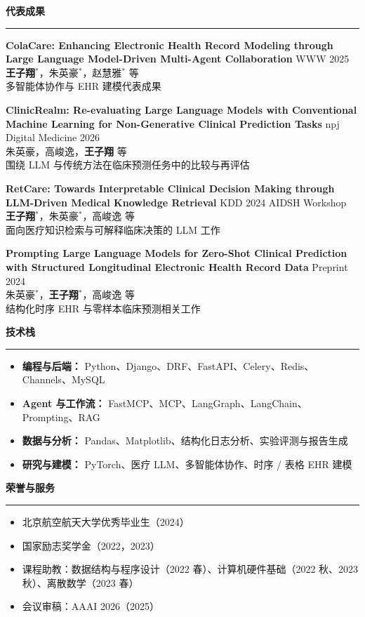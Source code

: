 \documentclass[10pt,a4paper]{ctexart}
\newcommand{\sectiontitle}[1]{
    \vspace{4mm}
    {\large\textbf{#1}}
    \vspace{1mm}
    \hrule
    \vspace{3mm}
}
\newcommand{\pubentry}[4]{
    \noindent
    \textbf{#1} \hfill #2 \\
    #3 \\
    {\small #4}
    \vspace{2mm}
}
\begin{document}
\sectiontitle{代表成果}

\pubentry
{ColaCare: Enhancing Electronic Health Record Modeling through Large Language Model-Driven Multi-Agent Collaboration}
{WWW 2025}
{\textbf{王子翔}$^{\ast}$，朱英豪$^{\ast}$，赵慧雅$^{\ast}$ 等}
{多智能体协作与 EHR 建模代表成果}

\pubentry
{ClinicRealm: Re-evaluating Large Language Models with Conventional Machine Learning for Non-Generative Clinical Prediction Tasks}
{npj Digital Medicine 2026}
{朱英豪，高峻逸，\textbf{王子翔} 等}
{围绕 LLM 与传统方法在临床预测任务中的比较与再评估}

\pubentry
{RetCare: Towards Interpretable Clinical Decision Making through LLM-Driven Medical Knowledge Retrieval}
{KDD 2024 AIDSH Workshop}
{\textbf{王子翔}$^{\ast}$，朱英豪$^{\ast}$，高峻逸 等}
{面向医疗知识检索与可解释临床决策的 LLM 工作}

\pubentry
{Prompting Large Language Models for Zero-Shot Clinical Prediction with Structured Longitudinal Electronic Health Record Data}
{Preprint 2024}
{朱英豪$^{\ast}$，\textbf{王子翔}$^{\ast}$，高峻逸 等}
{结构化时序 EHR 与零样本临床预测相关工作}

\sectiontitle{技术栈}

\begin{itemize}
    \item \textbf{编程与后端：} Python、Django、DRF、FastAPI、Celery、Redis、Channels、MySQL
    \item \textbf{Agent 与工作流：} FastMCP、MCP、LangGraph、LangChain、Prompting、RAG
    \item \textbf{数据与分析：} Pandas、Matplotlib、结构化日志分析、实验评测与报告生成
    \item \textbf{研究与建模：} PyTorch、医疗 LLM、多智能体协作、时序 / 表格 EHR 建模
\end{itemize}

\sectiontitle{荣誉与服务}

\begin{itemize}
    \item 北京航空航天大学优秀毕业生（2024）
    \item 国家励志奖学金（2022，2023）
    \item 课程助教：数据结构与程序设计（2022 春）、计算机硬件基础（2022 秋、2023 秋）、离散数学（2023 春）
    \item 会议审稿：AAAI 2026（2025）
\end{itemize}
\end{document}
